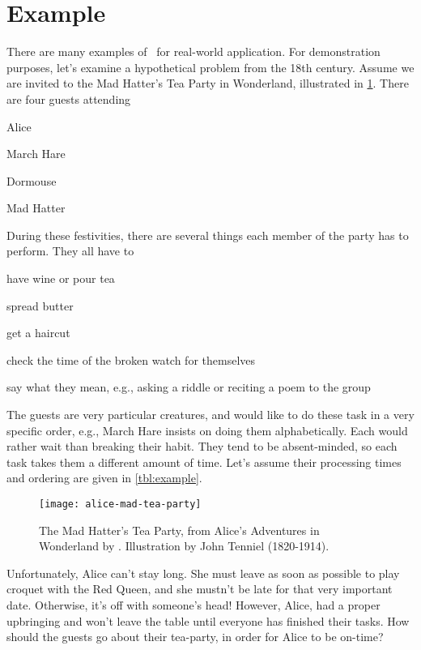 \section{Example}\label{sec:jsp:example}
There are many examples of \jsp\ for real-world application. 
For demonstration purposes, let's examine a hypothetical problem from 
the 18th century. Assume we are invited to the Mad Hatter's Tea Party in 
Wonderland, illustrated in \cref{fig:teaparty}. 
There are four guests attending
\begin{enumerate*}[label={$J_\arabic*$)}, ref={{$J_\arabic*$}}, 
    itemjoin*={{, and of course our host }}]
    \item Alice\label{guest:alice}
    \item March Hare\label{guest:marchhare}
    \item Dormouse\label{guest:dormouse}
    \item Mad Hatter\label{guest:madhatter}
\end{enumerate*}
During these festivities, there are several things each member of the party 
has to perform. They all have to
\begin{enumerate*}[label={$M_\arabic*$)}]
    \item have wine or pour tea
    \item spread butter
    \item get a haircut
    \item check the time of the broken watch for themselves
    \item say what they mean, e.g., asking a riddle  or reciting a poem to the 
    group
\end{enumerate*}
The guests are very particular creatures, and would like to do these task in a 
very specific order, e.g., March Hare insists on doing 
them alphabetically. Each would rather wait than breaking their habit.
They tend to be absent-minded, so each task takes them a different amount of 
time. 
Let's assume their processing times and ordering are given in 
\cref{tbl:example}. 


\begin{figure}[b!]\centering 
    \texttt{[image: alice-mad-tea-party]}
    \caption{The Mad Hatter's Tea Party, from Alice's Adventures in Wonderland 
        by \citet{alice}. Illustration by John Tenniel 
        (1820-1914).}\label{fig:teaparty}
\end{figure}



Unfortunately, Alice can't stay long. She must leave as soon as possible to 
play croquet with the Red Queen, 
and she mustn't be late for that very important date. Otherwise, it's off with 
someone's head! However, Alice, had a proper upbringing and won't leave the 
table until everyone has finished their tasks. 
How should the guests go about their tea-party, in order for Alice to be 
on-time?

